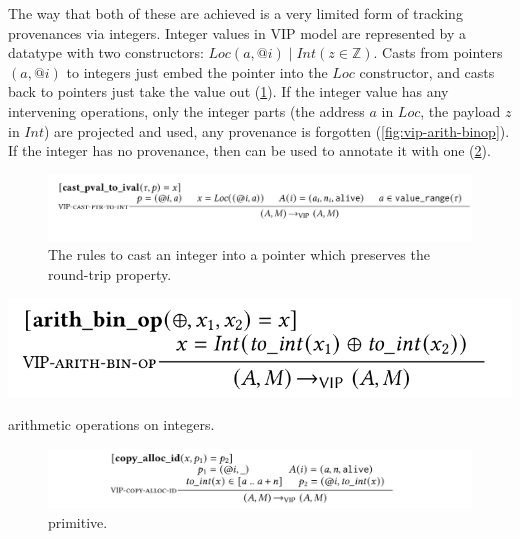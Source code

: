 The way that both of these are achieved is a very limited form of tracking
provenances via integers. Integer values in VIP model are represented by a
datatype with two constructors: $\mathit{Loc(a, @i)} \mid \mathit{Int(z \in
\mathbb{Z})}$. Casts from pointers $(a, @i)$ to integers just embed the pointer
into the $\mathit{Loc}$ constructor, and casts back to pointers just take the
value out (\cref{fig:vip-ival-to-pval}). If the integer value has any
intervening operations, only the integer parts (the address $a$ in
$\mathit{Loc}$, the payload $z$ in $\mathit{Int}$) are projected and used, any
provenance is forgotten (\cref{fig:vip-arith-binop}). If the integer has no
provenance, then  can be used to annotate it with one
(\cref{fig:vip-copy-alloc-id}).

\begin{figure}[tp]
    \includegraphics{figures/mem-model-vip-ival-to-pval}
    \caption{The  rules to cast an integer into a pointer which
    preserves the round-trip property.}\label{fig:vip-ival-to-pval}
\end{figure}

\begin{marginfigure}
    \includegraphics{figures/mem-model-vip-arith-binop}
    \caption{ arithmetic operations on integers.}\label{fig:vip-arith-binop}
\end{marginfigure}

\begin{figure}[tp]
    \includegraphics{figures/mem-model-vip-copy-alloc-id}
    \caption{  primitive.}\label{fig:vip-copy-alloc-id}
\end{figure}

